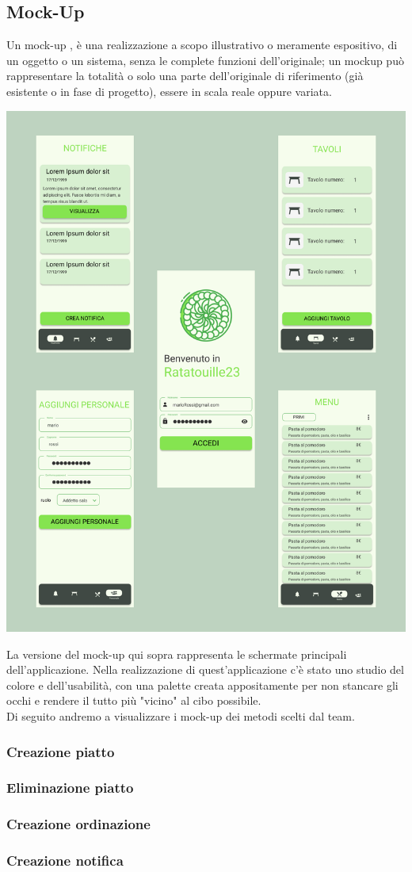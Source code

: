 \subsection{Mock-Up}
Un mock-up , è una realizzazione a scopo illustrativo o meramente espositivo, di un oggetto o un sistema, senza le complete funzioni
dell'originale; un mockup può rappresentare la totalità o solo una parte dell'originale di riferimento (già esistente o in fase di progetto), essere in scala
reale oppure variata.
\begin{center}
  \includegraphics[scale=0.2]{img/Mock-up.doc}
\end{center}
La versione del mock-up qui sopra rappresenta le schermate principali dell'applicazione. Nella realizzazione di quest'applicazione c'è stato uno studio del colore e dell'usabilità, con una palette creata appositamente per non stancare gli occhi e rendere il tutto più "vicino" al cibo possibile.\\
Di seguito andremo a visualizzare i mock-up dei metodi scelti dal team.
\subsubsection{Creazione piatto}
\subsubsection{Eliminazione piatto}
\subsubsection{Creazione ordinazione}
\subsubsection{Creazione notifica}